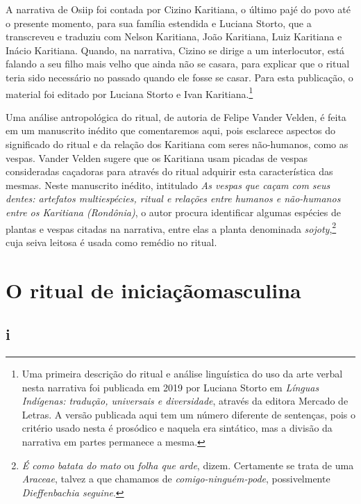  A narrativa de Osiip foi contada por Cizino Karitiana, o último pajé do
 povo até o presente momento, para sua família estendida e Luciana
 Storto, que a transcreveu e traduziu com Nelson Karitiana, João
 Karitiana, Luiz Karitiana e Inácio Karitiana. Quando, na narrativa,
 Cizino se dirige a um interlocutor, está falando a seu filho mais velho
 que ainda não se casara, para explicar que o ritual teria sido
 necessário no passado quando ele fosse se casar. Para esta publicação, o
 material foi editado por Luciana Storto e Ivan Karitiana.\footnote{Uma primeira descrição do ritual e análise linguística do uso da arte
 verbal nesta narrativa foi publicada em 2019 por Luciana Storto em
 \textit{Línguas Indígenas: tradução, universais e diversidade}, através da
 editora Mercado de Letras. A versão publicada aqui tem um número
 diferente de sentenças, pois o critério usado nesta é prosódico e
 naquela era sintático, mas a divisão da narrativa em partes permanece a
 mesma.}

 Uma análise antropológica do ritual, de autoria de Felipe Vander Velden,
 é feita em um manuscrito inédito que comentaremos aqui, pois esclarece
 aspectos do significado do ritual e da relação dos Karitiana com seres
 não-humanos, como as vespas. Vander Velden sugere que os Karitiana usam
 picadas de vespas consideradas caçadoras para através do ritual adquirir
 esta característica das mesmas. Neste manuscrito inédito, intitulado
\textit{As vespas que caçam com seus dentes: artefatos multiespécies, ritual e
 relações entre humanos e não-humanos entre os Karitiana (Rondônia)}, o
 autor procura identificar algumas espécies de plantas e vespas citadas
 na narrativa, entre elas a planta denominada \textit{sojoty},\footnote{\textit{É como batata do mato} ou \textit{folha que arde},
 dizem. Certamente se trata de uma \textit{Araceae}, talvez a que chamamos
 de \textit{comigo-ninguém-pode}, possivelmente \textit{Dieffenbachia
 seguine}.} cuja seiva
 leitosa é usada como remédio no ritual.
 \vspace*{\fill}

 \chapter[O ritual de iniciação masculina]{O ritual de iniciação\break masculina}
 

\section{i}

